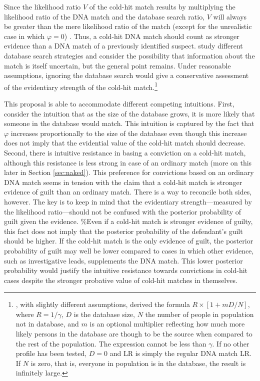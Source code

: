 \documentclass[10pt,dvipsnames,enabledeprecatedfontcommands]{scrartcl}
\begin{document}
Since the likelihood ratio \(V\) of the cold-hit match results by
multiplying the likelihood ratio of the DNA match and the database
search ratio, \(V\) will always be greater than the mere likelihood
ratio of the match (except for the unrealistic case in which
\(\varphi=0\)) . Thus, a cold-hit DNA match should count as stronger
evidence than a DNA match of a previously identified suspect.
\citet{dawid1996CoherentAnalysisForensic} study different database
search strategies and consider the possibility that information about
the match is itself uncertain, but the general point remains. Under
reasonable assumptions, ignoring the database search would give a
conservative assessment of the evidentiary strength of the cold-hit
match.\footnote{\citet{donnelly1999DNADatabaseSearches}, with slightly different assumptions, derived the formula $R \times [1+mD/N]$, where $R = 1/\gamma$, $D$ is the database size, $N$ the number of people in population not in database, and $m$ is an optional multiplier reflecting how much more likely persons in the database are though to be the source when compared to the rest of the population. The expression cannot be less than $\gamma$. If no other profile has been tested, $D=0$ and LR is simply the regular DNA match LR. If $N$ is zero, that is, everyone in population is in the database, the result is infinitely large.}

This proposal is able to accommodate different competing intuitions.
First, consider the intuition that as the size of the database grows, it
is more likely that someone in the database would match. This intuition
is captured by the fact that \(\varphi\) increases proportionally to the
size of the database even though this increase does not imply that the
evidential value of the cold-hit match should decrease. Second, there is
intuitive resistance in basing a conviction on a cold-hit match,
although this resistance is less strong in case of an ordinary match
(more on this later in Section \ref{sec:naked}). This preference for
convictions based on an ordinary DNA match seems in tension with the
claim that a cold-hit match is stronger evidence of guilt than an
ordinary match. There is a way to reconcile both sides, however. The key
is to keep in mind that the evidentiary strength---measured by the
likelihood ratio---should not be confused with the posterior probability
of guilt given the evidence. \%Even if a cold-hit match is stronger
evidence of guilty, this fact does not imply that the posterior
probability of the defendant's guilt should be higher. If the cold-hit
match is the only evidence of guilt, the posterior probability of guilt
may well be lower compared to cases in which other evidence, such as
investigative leads, supplements the DNA match. This lower posterior
probability would justify the intuitive resistance towards convictions
in cold-hit cases despite the stronger probative value of cold-hit
matches in themselves.
\end{document}
